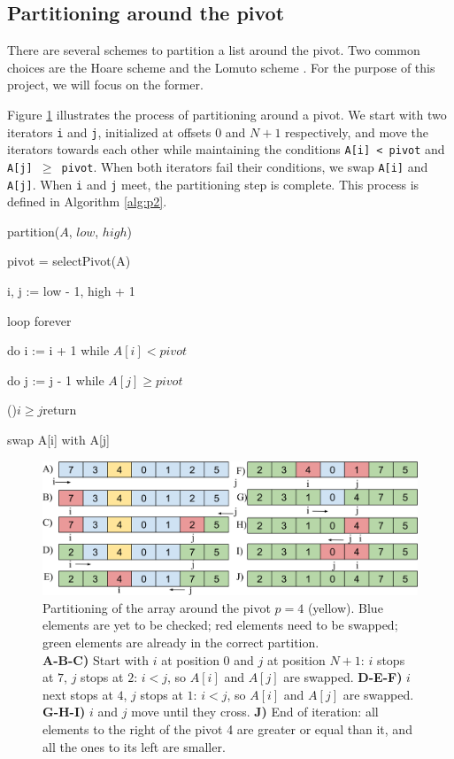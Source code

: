 \documentclass[]{finalproject}
\begin{document}
\subsection{Partitioning around the pivot}
There are several schemes to partition a list around the pivot. Two common choices are the Hoare scheme and the Lomuto scheme \cite{qs-scheme}.
For the purpose of this project, we will focus on the former.

Figure \ref{fig:rec-part2} illustrates the process of partitioning around a pivot. We start with two iterators \texttt{i} and \texttt{j},
initialized at offsets $0$ and $N+1$ respectively, and move the iterators towards each other while maintaining the conditions \texttt{A[i] < pivot}
and \texttt{A[j] $\geq$ pivot}. When both iterators fail their conditions, we swap \texttt{A[i]} and \texttt{A[j]}.
When \texttt{i} and \texttt{j} meet, the partitioning step is complete. This process is defined in Algorithm \ref{alg:p2}.

\begin{algorithm}
\caption{partition($A$, $low$, $high$)}
\label{alg:p2}

pivot = selectPivot(A)

i, j := low - 1, high + 1

loop forever

\Indp

do i := i + 1 while $A[i] < pivot$

do j := j - 1 while $A[j] \geq pivot$

\If(){$i \geq j$}{return}

swap A[i] with A[j]
\end{algorithm}

\begin{figure}[H]
\begin{center}
\includegraphics[scale=0.4]{img/pivot_partitioning.png}
\end{center}
\caption{Partitioning of the array around the pivot $p=4$ (yellow).
Blue elements are yet to be checked; red elements need to be swapped; green elements are already in the correct partition.\\
\textbf{A-B-C)} Start with $i$ at position $0$ and $j$ at position $N+1$: $i$ stops at $7$, $j$ stops at $2$: $i<j$, so $A[i]$ and $A[j]$ are swapped.
\textbf{D-E-F)} $i$ next stops at $4$, $j$ stops at $1$: $i<j$, so $A[i]$ and $A[j]$ are swapped.
\textbf{G-H-I)} $i$ and $j$ move until they cross.
\textbf{J)} End of iteration: all elements to the right of the pivot 4 are greater or equal than it, and all the ones to its left are smaller.}
\label{fig:rec-part2}
\end{figure}
\end{document}

